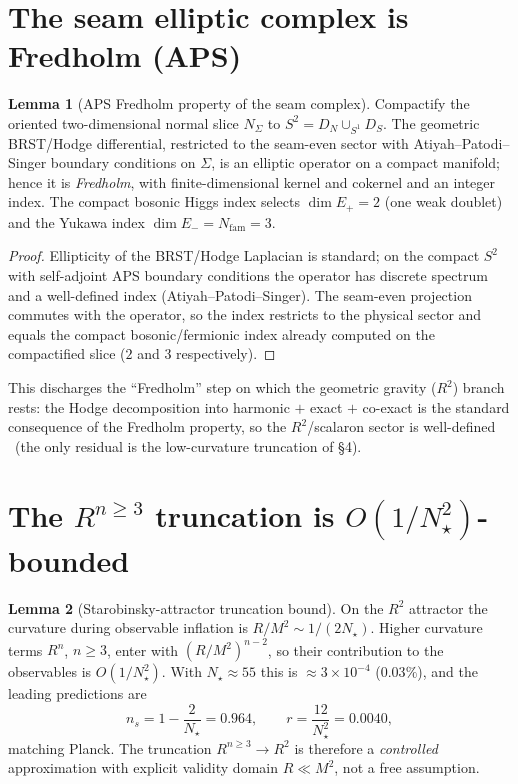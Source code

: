 \documentclass[11pt,a4paper]{article}
\newcommand{\Nfam}{N_{\mathrm{fam}}}
\theoremstyle{definition}
\newtheorem{lemma}{Lemma}
\begin{document}
\section{The seam elliptic complex is Fredholm (APS)}
\begin{lemma}[APS Fredholm property of the seam complex]
\label{lem:aps}
Compactify the oriented two-dimensional normal slice $N_\Sigma$ to $S^2=D_N\cup_{S^1}D_S$.
The geometric BRST/Hodge differential, restricted to the seam-even sector with Atiyah--Patodi--Singer
boundary conditions on $\Sigma$, is an elliptic operator on a compact manifold; hence it is
\emph{Fredholm}, with finite-dimensional kernel and cokernel and an integer index. The compact bosonic
Higgs index selects $\dim E_+=2$ (one weak doublet) and the Yukawa index $\dim E_-=\Nfam=3$.
\end{lemma}
\begin{proof}
Ellipticity of the BRST/Hodge Laplacian is standard; on the compact $S^2$ with self-adjoint APS
boundary conditions the operator has discrete spectrum and a well-defined index (Atiyah--Patodi--Singer).
The seam-even projection commutes with the operator, so the index restricts to the physical sector and
equals the compact bosonic/fermionic index already computed on the compactified slice ($2$ and $3$ respectively).
\end{proof}

\noindent This discharges the ``Fredholm'' step on which the geometric gravity ($R^2$) branch rests:
the Hodge decomposition into harmonic $+$ exact $+$ co-exact is the standard consequence of the Fredholm
property, so the $R^2$/scalaron sector is well-defined \mE\ (the only residual is the low-curvature
truncation of \S4).

\section{The $R^{n\ge3}$ truncation is $O(1/N_\star^2)$-bounded}
\begin{lemma}[Starobinsky-attractor truncation bound]
\label{lem:trunc}
On the $R^2$ attractor the curvature during observable inflation is $R/M^2\sim 1/(2N_\star)$. Higher
curvature terms $R^{n}$, $n\ge3$, enter with $(R/M^2)^{n-2}$, so their contribution to the observables is
$O(1/N_\star^2)$. With $N_\star\approx55$ this is $\approx3\times10^{-4}$ ($0.03\%$), and the leading
predictions are
\[
  n_s=1-\frac2{N_\star}=0.964,\qquad r=\frac{12}{N_\star^2}=0.0040 ,
\]
matching Planck. The truncation $R^{n\ge3}\!\to\!R^2$ is therefore a \emph{controlled} approximation with
explicit validity domain $R\ll M^2$, not a free assumption.
\end{lemma}
\end{document}
